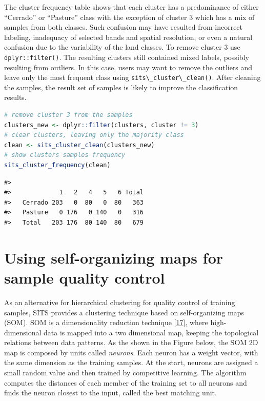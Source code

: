 \documentclass[
  11pt,
]{report}
\newcommand{\passthrough}[1]{#1}
\begin{document}
The cluster frequency table shows that each cluster has a predominance
of either ``Cerrado'' or ``Pasture'' class with the exception of cluster
\(3\) which has a mix of samples from both classes. Such confusion may
have resulted from incorrect labeling, inadequacy of selected bands and
spatial resolution, or even a natural confusion due to the variability
of the land classes. To remove cluster \(3\) use
\passthrough{\lstinline!dplyr::filter()!}. The resulting clusters still
contained mixed labels, possibly resulting from outliers. In this case,
users may want to remove the outliers and leave only the most frequent
class using \passthrough{\lstinline!sits\_cluster\_clean()!}. After
cleaning the samples, the result set of samples is likely to improve the
classification results.

\begin{lstlisting}[language=R]
# remove cluster 3 from the samples
clusters_new <- dplyr::filter(clusters, cluster != 3)
# clear clusters, leaving only the majority class
clean <- sits_cluster_clean(clusters_new)
# show clusters samples frequency
sits_cluster_frequency(clean)
\end{lstlisting}

\begin{lstlisting}
#>          
#>             1   2   4   5   6 Total
#>   Cerrado 203   0  80   0  80   363
#>   Pasture   0 176   0 140   0   316
#>   Total   203 176  80 140  80   679
\end{lstlisting}

\hypertarget{using-self-organizing-maps-for-sample-quality-control}{%
\section*{Using self-organizing maps for sample quality
control}\label{using-self-organizing-maps-for-sample-quality-control}}

As an alternative for hierarchical clustering for quality control of
training samples, SITS provides a clustering technique based on
self-organizing maps (SOM). SOM is a dimensionality reduction technique
\protect\hyperlink{ref-Kohonen1990}{{[}17{]}}, where high-dimensional
data is mapped into a two dimensional map, keeping the topological
relations between data patterns. As the shown in the Figure below, the
SOM 2D map is composed by units called \emph{neurons}. Each neuron has a
weight vector, with the same dimension as the training samples. At the
start, neurons are assigned a small random value and then trained by
competitive learning. The algorithm computes the distances of each
member of the training set to all neurons and finds the neuron closest
to the input, called the best matching unit.
\end{document}
